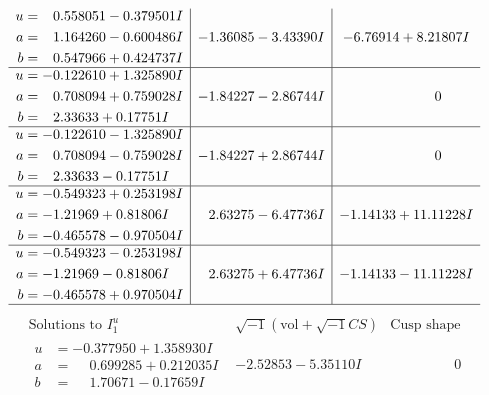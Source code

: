 \documentclass[1p]{elsarticle_modified}
\theoremstyle{definition}
\newcommand{\I}{\sqrt{-1}}
\begin{document}
$$\begin{array}{c|c|c}
\begin{aligned}
u &= \phantom{-}0.558051 - 0.379501 I \\
a &= \phantom{-}1.164260 - 0.600486 I \\
b &= \phantom{-}0.547966 + 0.424737 I\end{aligned}
 & -1.36085 - 3.43390 I & -6.76914 + 8.21807 I \\ \hline\begin{aligned}
u &= -0.122610 + 1.325890 I \\
a &= \phantom{-}0.708094 + 0.759028 I \\
b &= \phantom{-}2.33633 + 0.17751 I\end{aligned}
 & -1.84227 - 2.86744 I & \phantom{-0.000000 } 0 \\ \hline\begin{aligned}
u &= -0.122610 - 1.325890 I \\
a &= \phantom{-}0.708094 - 0.759028 I \\
b &= \phantom{-}2.33633 - 0.17751 I\end{aligned}
 & -1.84227 + 2.86744 I & \phantom{-0.000000 } 0 \\ \hline\begin{aligned}
u &= -0.549323 + 0.253198 I \\
a &= -1.21969 + 0.81806 I \\
b &= -0.465578 - 0.970504 I\end{aligned}
 & \phantom{-}2.63275 - 6.47736 I & -1.14133 + 11.11228 I \\ \hline\begin{aligned}
u &= -0.549323 - 0.253198 I \\
a &= -1.21969 - 0.81806 I \\
b &= -0.465578 + 0.970504 I\end{aligned}
 & \phantom{-}2.63275 + 6.47736 I & -1.14133 - 11.11228 I\\
 \hline 
 \end{array}$$\newpage$$\begin{array}{c|c|c}  
\text{Solutions to }I^u_{1}& \I (\text{vol} + \sqrt{-1}CS) & \text{Cusp shape}\\
 \hline 
\begin{aligned}
u &= -0.377950 + 1.358930 I \\
a &= \phantom{-}0.699285 + 0.212035 I \\
b &= \phantom{-}1.70671 - 0.17659 I\end{aligned}
 & -2.52853 - 5.35110 I & \phantom{-0.000000 } 0 \\ \hline\begin{aligned}

\end{aligned}
\end{array}$$
\end{document}
